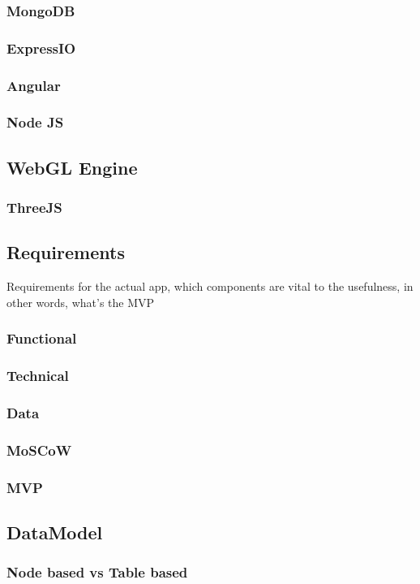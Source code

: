 \documentclass[15pt]{article}
\begin{document}
		\subsubsection{MongoDB}
		\subsubsection{ExpressIO}
		\subsubsection{Angular}
		\subsubsection{Node JS}
	\subsection{WebGL Engine}
		\subsubsection{ThreeJS}
	\subsection{Requirements}
		Requirements for the actual app, which components are vital to the usefulness, in other words, what's the MVP
		\subsubsection{Functional}
		\subsubsection{Technical}
		\subsubsection{Data}
		\subsubsection{MoSCoW}
		\subsubsection{MVP}
	\subsection{DataModel}
		\subsubsection{Node based vs Table based}
\end{document}
